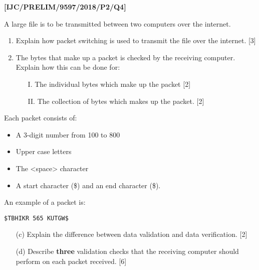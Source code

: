 \item \textbf{{[}IJC/PRELIM/9597/2018/P2/Q4{]} }

A large file is to be transmitted between two computers over the internet.
\begin{enumerate}
\item Explain how packet switching is used to transmit the file over the
internet. \hfill{}{[}3{]}
\item The bytes that make up a packet is checked by the receiving computer.
Explain how this can be done for:
\begin{enumerate}
\item[I. ] The individual bytes which make up the packet \hfill{}{[}2{]}
\item[II.]  The collection of bytes which makes up the packet. \hfill{}{[}2{]}
\end{enumerate}
\end{enumerate}
Each packet consists of: 
\begin{itemize}
\item A 3-digit number from 100 to 800 
\item Upper case letters 
\item The <space> character 
\item A start character (\$) and an end character (\$). 
\end{itemize}
An example of a packet is:
\noindent \begin{center}
\texttt{\$TBHIKR 565 KUTGW\$ }
\par\end{center}
\begin{enumerate}
\item[(c)]  Explain the difference between data validation and data verification.
\hfill{}{[}2{]}
\item[(d)]  Describe \textbf{three} validation checks that the receiving computer
should perform on each packet received. \hfill{}{[}6{]}
\end{enumerate}